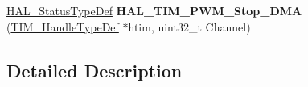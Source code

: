 \begin{DoxyCompactItemize}
\item 
\hyperlink{stm32f4xx__hal__def_8h_a63c0679d1cb8b8c684fbb0632743478f}{H\+A\+L\+\_\+\+Status\+Type\+Def} {\bfseries H\+A\+L\+\_\+\+T\+I\+M\+\_\+\+P\+W\+M\+\_\+\+Stop\+\_\+\+D\+MA} (\hyperlink{struct_t_i_m___handle_type_def}{T\+I\+M\+\_\+\+Handle\+Type\+Def} $\ast$htim, uint32\+\_\+t Channel)\hypertarget{group___t_i_m___exported___functions___group3_gad77367f9b8d8d17842a913f7d6ce274b}{}\label{group___t_i_m___exported___functions___group3_gad77367f9b8d8d17842a913f7d6ce274b}

\end{DoxyCompactItemize}


\subsection{Detailed Description}
